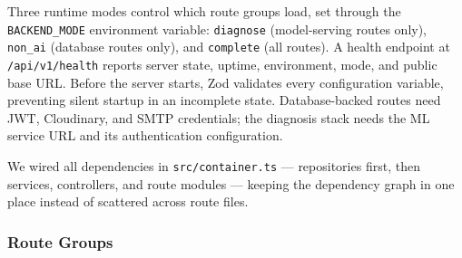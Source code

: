 Three runtime modes control which route groups load, set through the \texttt{BACKEND\_MODE}
environment variable: \texttt{diagnose} (model-serving routes only), \texttt{non\_ai} (database
routes only), and \texttt{complete} (all routes). A health endpoint at \texttt{/api/v1/health}
reports server state, uptime, environment, mode, and public base URL. Before the server
starts, Zod validates every configuration variable, preventing silent startup in an incomplete
state. Database-backed routes need JWT, Cloudinary, and SMTP credentials; the diagnosis stack
needs the ML service URL and its authentication configuration.

We wired all dependencies in \texttt{src/container.ts} --- repositories first, then services,
controllers, and route modules --- keeping the dependency graph in one place instead of
scattered across route files.


\subsubsection{Route Groups}

